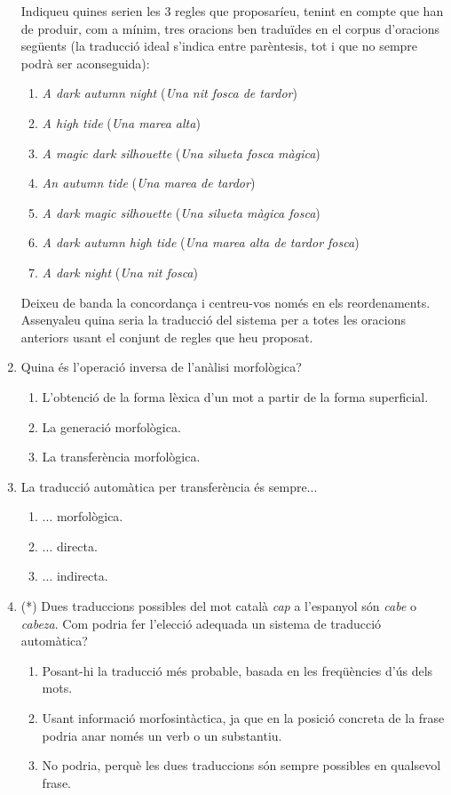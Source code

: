 \begin{enumerate}
  Indiqueu quines serien les 3 regles que proposaríeu, tenint en
  compte que han de produir, com a mínim, tres oracions ben traduïdes
  en el corpus d'oracions següents (la traducció ideal s'indica entre
  parèntesis, tot i que no sempre podrà ser aconseguida):
  \begin{enumerate}
  \item \emph{A dark autumn night} (\emph{Una nit fosca de
      tardor})
  \item \emph{A high tide} (\emph{Una marea alta}) 
  \item \emph{A magic dark silhouette} (\emph{Una silueta fosca
      màgica})
  \item \emph{An autumn tide} (\emph{Una marea de tardor})
  \item \emph{A dark magic silhouette} (\emph{Una silueta màgica
      fosca})
  \item \emph{A dark autumn high tide} (\emph{Una marea alta de
      tardor fosca})
  \item \emph{A dark night} (\emph{Una nit fosca})
  \end{enumerate}
    
  Deixeu de banda la concordança i centreu-vos només en els
  reordenaments. Assenyaleu quina seria la traducció del sistema per a
  totes les oracions anteriors usant el conjunt de regles que heu
  proposat.

\item Quina és l'operació inversa de l'anàlisi morfològica?
  \begin{enumerate}
  \item L'obtenció de la forma lèxica d'un mot a partir de la forma
    superficial.
  \item La generació morfològica.
  \item La transferència morfològica.
  \end{enumerate}

\item La traducció automàtica per transferència és sempre...
  \begin{enumerate}
  \item ... morfològica.
  \item ... directa.
  \item ... indirecta.
  \end{enumerate}

\item (*) Dues traduccions possibles del mot català \emph{cap} a
  l'espanyol són \emph{cabe} o \emph{cabeza}. Com podria fer l'elecció
  adequada un sistema de traducció automàtica?
  \begin{enumerate}
  \item Posant-hi la traducció més probable, basada en les freqüències
    d'ús dels mots.
  \item Usant informació morfosintàctica, ja que en la posició
    concreta de la frase podria anar només un verb o un substantiu.
  \item No podria, perquè les dues traduccions són sempre possibles en
    qualsevol frase.
  \end{enumerate}


\end{enumerate}
